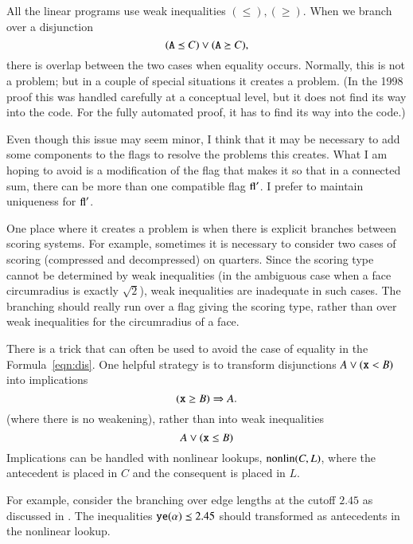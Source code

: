 All the linear programs use weak inequalities $(\le),(\ge)$.  When
we branch over a disjunction
    \begin{equation}
    \label{eqn:dis}
    ({\operatorname{{\texttt{A}}}}\preceq C)\vee ({\operatorname{{\texttt{A}}}}\succeq C),
    \end{equation}
there is overlap between the two cases when equality occurs.
Normally, this is not a problem; but in a couple of special
situations it creates a problem.  (In the 1998 proof this was
handled carefully at a conceptual level, but it does not find its
way into the code.  For the fully automated proof, it has to find
its way into the code.)

Even though this issue may seem minor, I think that it may be
necessary to add some components to the flags to resolve the
problems this creates.  What I am hoping to avoid is a
modification of the flag that makes it so that in a connected sum, there
can be more than one compatible flag ${\operatorname{fl}}'$.  I prefer to
maintain uniqueness for ${\operatorname{fl}}'$.

One place where it creates a problem is when there is explicit
branches between scoring systems.   For example, sometimes it is
necessary to consider two cases of scoring (compressed and 
decompressed) on quarters.  Since the scoring type cannot be
determined by weak inequalities (in the ambiguous case when a face
circumradius is exactly $\sqrt2$), weak inequalities are
inadequate in such cases.  The branching should really run over a
flag giving the scoring type, rather than over weak inequalities
for the circumradius of a face.


There is a trick that can often be used to avoid the case of
equality in the Formula~\ref{eqn:dis}.   One helpful strategy is
to transform disjunctions $A\vee ({\operatorname{{\texttt{x}}}} < B)$ into implications
    \begin{equation}
    ({\operatorname{{\texttt{x}}}} \ge B) \Rightarrow A.
    \end{equation}
(where there is no weakening), rather than into weak inequalities
    \begin{equation}
    A \vee ({\operatorname{{\texttt{x}}}}\le B)
    \end{equation}
Implications can be handled with nonlinear lookups,
${\operatorname{nonlin}}(C,L)$, where the antecedent is placed in $C$ and the
consequent is placed in $L$.

\begin{example}  For example, consider the branching over edge
lengths at the cutoff $2.45$ as discussed in \cite[Sec.25.7]{DCG}.
The inequalities ${\operatorname{{\texttt{ye}}}}(\alpha)\preceq 2.45$ should transformed
as antecedents in the nonlinear lookup.
\end{example}

